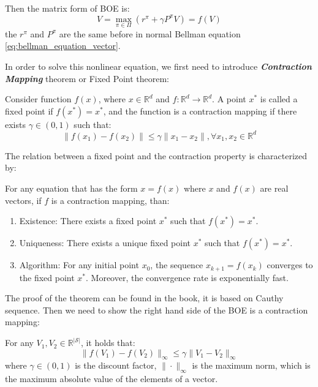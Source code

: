 \documentclass[10pt]{elegantbook}
\newcommand{\mydefination}[1]{\textbf{\textit{\textcolor{structurecolor}{#1}}}}
\begin{document}
Then the matrix form of BOE is:
\[ V = \max_{\pi \in \Pi} (r^{\pi} + \gamma P^{\pi}V) = f(V) \]
the $r^{\pi}$ and $P^{\pi}$ are the same before in normal Bellman equation \ref{eq:bellman_equation_vector}.

In order to solve this nonlinear equation, we first need to introduce \mydefination{Contraction Mapping} theorem or Fixed Point theorem:
\begin{definition}
    Consider function $f(x)$, where $x \in \mathbb R^d$ and $f:\mathbb R^d \rightarrow \mathbb R^d$. A point $x^*$ is called a fixed point if 
    $f(x^*) = x^*$, and the function is a contraction mapping if there exists $\gamma \in (0, 1)$ such that:
    \[ \| f(x_1) - f(x_2) \| \leq \gamma \| x_1 - x_2 \|, \forall x_1, x_2 \in \mathbb R^d \] 
\end{definition}

The relation between a fixed point and the contraction property is characterized by:
\begin{theorem}
    For any equation that has the form $x = f(x)$ where $x$ and $f(x)$ are real vectors, if $f$ is a contraction mapping, than:
    \begin{enumerate}
        \item Existence: There exists a fixed point $x^*$ such that $f(x^*) = x^*$.
        \item Uniqueness: There exists a unique fixed point $x^*$ such that $f(x^*) = x^*$.
        \item Algorithm: For any initial point $x_0$, the sequence $x_{k+1} = f(x_k)$ converges to the fixed point $x^*$.
        Moreover, the convergence rate is exponentially fast.
    \end{enumerate}
\end{theorem}

The proof of the theorem can be found in the book, it is based on Cauthy sequence. Then we need to show the right hand side of the BOE is a contraction mapping:
\begin{theorem}
    For any $V_1, V_2 \in \mathbb R^{|\mathcal S|}$, it holds that:
    \[ \| f(V_1) - f(V_2) \|_{\infty} \leq \gamma \| V_1 - V_2 \|_{\infty} \]
    where $\gamma \in (0, 1)$ is the discount factor, $\| \cdot \|_{\infty}$ is the maximum norm, which is the
maximum absolute value of the elements of a vector.
\end{theorem}
\end{document}
